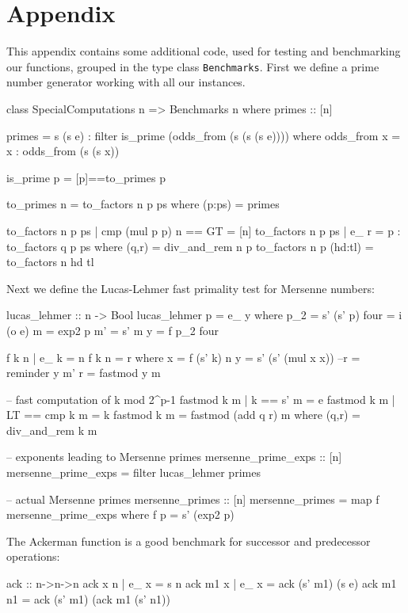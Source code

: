 \documentclass{TOOLS/llncs}
\begin{document}

%


\section*{Appendix}
This appendix contains some additional code, used for testing
and benchmarking our functions, grouped in the type class {\tt Benchmarks}.
First we define a prime number generator working with all our instances.
\begin{code}
class SpecialComputations n => Benchmarks n where
  primes :: [n]

  primes = s (s e) : filter is_prime (odds_from (s (s (s e)))) where
    odds_from x = x : odds_from (s (s x))
    
    is_prime p = [p]==to_primes p
    
    to_primes n = to_factors n p ps where
       (p:ps) = primes
    
    to_factors n p ps | cmp (mul p p) n == GT = [n]
    to_factors n p ps | e_ r =  p : to_factors q p ps where
       (q,r) = div_and_rem n p
    to_factors n p (hd:tl) = to_factors n hd tl
\end{code}
Next we define the Lucas-Lehmer fast primality test for Mersenne numbers:
\begin{code}
  lucas_lehmer :: n -> Bool
  lucas_lehmer p = e_ y where
    p_2 = s' (s' p)
    four = i (o e)
    m  = exp2 p
    m' = s' m
    y = f p_2 four
 
    f k n | e_ k = n
    f k n = r where 
      x = f (s' k) n
      y = s' (s' (mul x x))
      --r = reminder y m'
      r = fastmod y m 

    -- fast computation of k mod 2^p-1  
    fastmod k m | k == s' m = e
    fastmod k m | LT == cmp k m = k
    fastmod k m = fastmod (add q r) m where
       (q,r) = div_and_rem k m
  
  -- exponents leading to Mersenne primes
  mersenne_prime_exps :: [n]
  mersenne_prime_exps = filter lucas_lehmer primes
  
  -- actual Mersenne primes
  mersenne_primes :: [n]
  mersenne_primes = map f mersenne_prime_exps where
    f p = s' (exp2 p)   
\end{code}
The Ackerman function is a good benchmark for
successor and predecessor operations:
\begin{code}    
  ack :: n->n->n
  ack x n | e_ x = s n
  ack m1 x | e_ x = ack (s' m1) (s e)
  ack m1 n1 = ack (s' m1) (ack m1 (s' n1))
\end{code}
\end{document}

